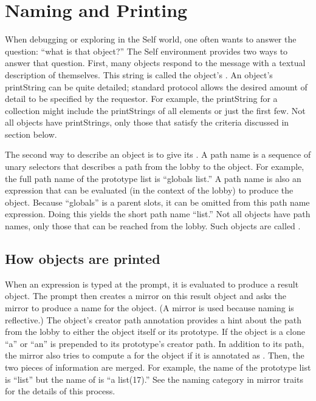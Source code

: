\documentclass[letterpaper,10pt,english]{sphinxmanual}
\begin{document}
\section{Naming and Printing}
\label{\detokenize{progguid:naming-and-printing}}
When debugging or exploring in the Self world, one often wants to answer the question: “what is
that object?” The Self environment provides two ways to answer that question. First, many objects
respond to the  message with a textual description of themselves. This string
is called the object’s . An object’s printString can be quite detailed; standard protocol
allows the desired amount of detail to be specified by the requestor. For example, the printString
for a collection might include the printStrings of all elements or just the first few. Not all objects
have printStrings, only those that satisfy the criteria discussed in section {\hyperref[\detokenize{progguid:how-to-make-an-object-print}]{}}
{\hyperref[\detokenize{progguid:id1}]{}} below.

The second way to describe an object is to give its . A path name is a sequence of unary
selectors that describes a path from the lobby to the object. For example, the full path name of the
prototype list is “globals list.” A path name is also an expression that can be evaluated (in the context
of the lobby) to produce the object. Because “globals” is a parent slots, it can be omitted from
this path name expression. Doing this yields the short path name “list.” Not all objects have path
names, only those that can be reached from the lobby. Such objects are called .


\subsection{How objects are printed}
\label{\detokenize{progguid:how-objects-are-printed}}
When an expression is typed at the prompt, it is evaluated to produce a result object. The prompt
then creates a mirror on this result object and asks the mirror to produce a name for the object. (A
mirror is used because naming is reflective.) The object’s creator path annotation provides a hint
about the path from the lobby to either the object itself or its prototype. If the object is a clone “a”
or “an” is prepended to its prototype’s creator path. In addition to its path, the mirror also tries to
compute a  for the object if it is annotated as . Then, the two pieces of
information are merged. For example, the name of the prototype list is “list” but the name of 
is “a list(17).” See the naming category in mirror traits for the details of this process.
\end{document}
